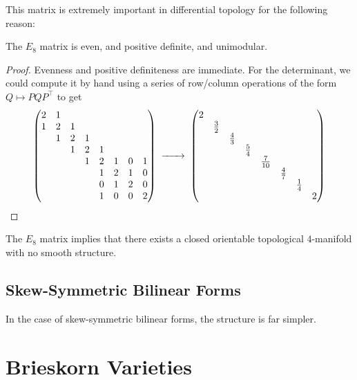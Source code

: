 This matrix is extremely important in differential topology for the following reason:
\begin{proposition}
	The $E_8$ matrix is even, and positive definite, and unimodular.
\end{proposition}
\begin{proof}
	Evenness and positive definiteness are immediate. For the determinant, we could compute it by hand using a series of row/column operations of the form $Q\mapsto PQP^\intercal$ to get
	\[
		\begin{pmatrix}
			2 & 1 &   &   &   &   &   &   \\
			1 & 2 & 1 &   &   &   &   &   \\
			  & 1 & 2 & 1 &   &   &   &   \\
			  &   & 1 & 2 & 1 &   &   &   \\
			  &   &   & 1 & 2 & 1 & 0 & 1 \\
			  &   &   &   & 1 & 2 & 1 & 0 \\
			  &   &   &   & 0 & 1 & 2 & 0 \\
			  &   &   &   & 1 & 0 & 0 & 2 \\
		\end{pmatrix}
		\lkxto
		\begin{pmatrix}
			2 &             &             &             &              &             &             &   \\
			  & \frac{3}{2} &             &             &              &             &             &   \\
			  &             & \frac{4}{3} &             &              &             &             &   \\
			  &             &             & \frac{5}{4} &              &             &             &   \\
			  &             &             &             & \frac{7}{10} &             &             &   \\
			  &             &             &             &              & \frac{4}{7} &             &   \\
			  &             &             &             &              &             & \frac{1}{4} &   \\
			  &             &             &             &              &             &             & 2 \\
		\end{pmatrix}
	\]
\end{proof}

\begin{remark}\label{rmk:E8-manifold}
	The $E_8$ matrix implies that there exists a closed orientable topological $4$-manifold with no smooth structure.  \cite{freedman1982manifold}
\end{remark}


\subsection{Skew-Symmetric Bilinear Forms}

In the case of skew-symmetric bilinear forms, the structure is far simpler.

\pagebreak
\section{Brieskorn Varieties}\label{sec:brieskorn}
\cite{milnor1968hypersurfaces}
\cite{kauffman1987knots}
